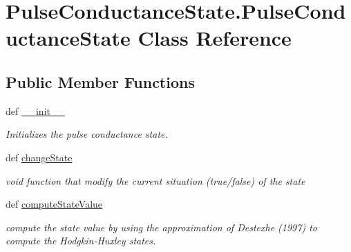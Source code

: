\hypertarget{class_pulse_conductance_state_1_1_pulse_conductance_state}{\section{Pulse\-Conductance\-State.\-Pulse\-Conductance\-State Class Reference}
\label{class_pulse_conductance_state_1_1_pulse_conductance_state}
}
\subsection*{Public Member Functions}
\begin{DoxyCompactItemize}
\item 
def \hyperlink{class_pulse_conductance_state_1_1_pulse_conductance_state_a21c7b2a5374d272d27296ea8bc968f36}{\-\_\-\-\_\-init\-\_\-\-\_\-}
\begin{DoxyCompactList}\small\item\em Initializes the pulse conductance state. \end{DoxyCompactList}\item 
def \hyperlink{class_pulse_conductance_state_1_1_pulse_conductance_state_ac1ee5a9b9dc0ad6aa8e86052aa17268f}{change\-State}
\begin{DoxyCompactList}\small\item\em void function that modify the current situation (true/false) of the state \end{DoxyCompactList}\item 
def \hyperlink{class_pulse_conductance_state_1_1_pulse_conductance_state_ae81d1a5bbbf4fd80db0ded06631bd9c2}{compute\-State\-Value}
\begin{DoxyCompactList}\small\item\em compute the state value by using the approximation of Destexhe (1997) to compute the Hodgkin-\/\-Huxley states. \end{DoxyCompactList}\end{DoxyCompactItemize}
